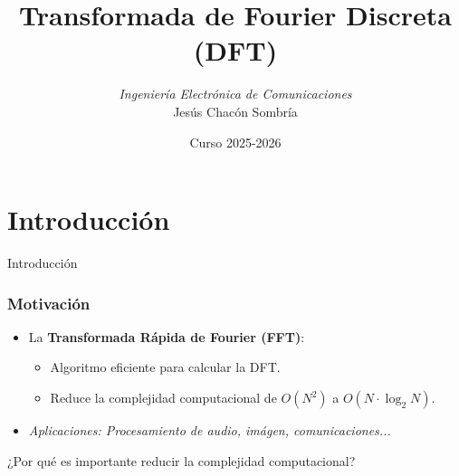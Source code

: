 \documentclass{beamer}
\title[Procesamiento de Señales]{Transformada de Fourier Discreta (DFT)}
\author[J. Chacón]{%
\textit{Ingeniería Electrónica de Comunicaciones }\\
\vspace{0.6cm}
\small Jesús Chacón Sombría}
\institute[DACYA] %
{

\footnotesize  Departamento de Arquitectura de Computadores y Automática.\\
  Universidad Complutense de Madrid
  }
\date[Transformada Fourier Discreta] %
{\footnotesize Curso 2025-2026}%
\newcommand{\MyLogo}{%
\begin{textblock}{14}(116.0,0.6)
  \pgfuseimage{logo}
\end{textblock}
}
\numberwithin{section}{part}
\begin{document}
\begin{frame}
  \titlepage
\end{frame}

\newcommand*\oldmacro{}%
\let\oldmacro\insertshorttitle%
\renewcommand*\insertshorttitle{%
 \MyLogo
  \oldmacro\hfill%
}

\AtBeginSection[]{}

\AtBeginSubsection[]{}      


\section{Introducción}
\begin{frame}{Introducción}
  \frametitle{Motivación}
  \begin{itemize}
    \item La \textbf{Transformada Rápida de Fourier (FFT)}:
    \begin{itemize}
      \item Algoritmo eficiente para calcular la DFT.
      \item Reduce la complejidad computacional de \(O(N^2)\) a \(O(N\cdot\log_2 N)\).
    \end{itemize}
    \item \emph{Aplicaciones: Procesamiento de audio, imágen, comunicaciones...}
  \end{itemize}
  \vspace{1cm}
  \centering\alert{¿Por qué es importante reducir la complejidad computacional?}\\

\end{frame}
\end{document}
